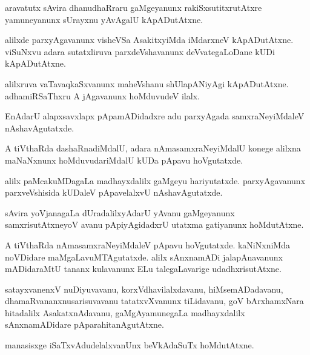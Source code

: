 \documentclass{article}
\begin{document}
\begin{mn}
 aravatutx sAvira dhanudhaRraru gaMgeyanunx rakiSxsutitxrutAtxre yamuneyanunx sUrayxnu yAvAgalU 
 kApADutAtxne.
\end{mn}

\begin{mn}
alilxde parxyAgavanunx visheVSa AsakitxyiMda iMdarxneV  kApADutAtxne. viSuNxvu adara sutatxliruva 
parxdeVshavanunx deVvategaLoDane kUDi kApADutAtxne.
\end{mn}

\begin{mn}
alilxruva vaTavaqkaSxvanunx maheVshanu shUlapANiyAgi kApADutAtxne. adhamiRSaThxru A jAgavanunx 
hoMduvudeV ilalx.
\end{mn}

\begin{mn}
EnAdarU alapxsavxlapx pApamADidadxre adu parxyAgada samxraNeyiMdaleV nAshavAgutatxde.
\end{mn}

\begin{mn}
A tiVthaRda dashaRnadiMdalU, adara nAmasamxraNeyiMdalU konege alilxna maNaNxnunx hoMduvudariMdalU 
kUDa pApavu hoVgutatxde.
\end{mn}

\begin{mn}
alilx paMcakuMDagaLa madhayxdalilx  gaMgeyu hariyutatxde. parxyAgavanunx parxveVshisida kUDaleV 
pApavelalxvU nAshavAgutatxde.
\end{mn}

\begin{mn}
sAvira yoVjanagaLa dUradalilxyAdarU yAvanu gaMgeyanunx samxrisutAtxneyoV avanu pApiyAgidadxrU 
utatxma gatiyanunx hoMdutAtxne.
\end{mn}

\begin{mn}
A tiVthaRda nAmasamxraNeyiMdaleV pApavu hoVgutatxde. kaNiNxniMda noVDidare maMgaLavuMTAgutatxde. 
alilx sAnxnamADi jalapAnavanunx mADidaraMtU tananx kulavanunx ELu talegaLavarige udadhxrisutAtxne.
\end{mn}

\begin{mn}
satayxvanenxV nuDiyuvavanu, korxVdhavilalxdavanu, hiMsemADadavanu, dhamaRvananxnusarisuvavanu 
tatatxvXvanunx tiLidavanu, goV bArxhamxNara hitadalilx AsakatxnAdavanu, gaMgAyamunegaLa 
madhayxdalilx sAnxnamADidare pAparahitanAgutAtxne.
\end{mn}

\begin{mn}
manasisxge iSaTxvAdudelalxvanUnx beVkAdaSuTx hoMdutAtxne.
\end{mn}
\end{document}

